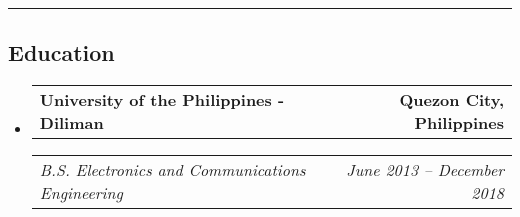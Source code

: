 \documentclass[11pt,letterpaper]{article}
\makeatletter
\newcommand{\headerrow}[2]
{\begin{tabular*}{\linewidth}{l@{\extracolsep{\fill}}r}
#1 &
#2 \\
\end{tabular*}}
\makeatother
\begin{document}
\hrule
\vspace{-1em}
\subsection*{\Large Education}

\begin{itemize}[leftmargin=1em]
	\parskip=0.1em
		
	\item
	      \headerrow
	      {\textbf{University of the Philippines - Diliman}}
	      {\textbf{Quezon City, Philippines}}
	      \headerrow
	      {\emph{B.S. Electronics and Communications Engineering}}
	      {\emph{June 2013 -- December 2018}}
	      	      
\end{itemize}
\end{document}
